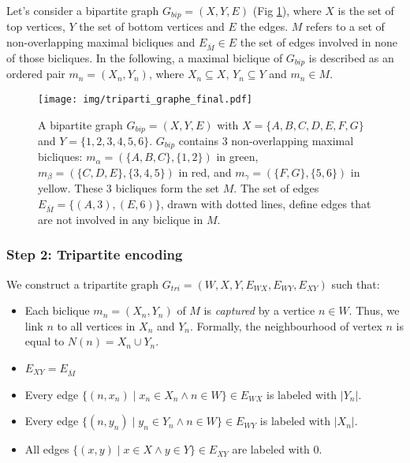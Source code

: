 \documentclass[table]{report}
\begin{document}
Let's consider a bipartite graph $G_{bip}=(X,Y,E)$ (Fig \ref{fig:triparti_graphe_exemple}), where $X$ is the set of top vertices, $Y$ the set of bottom vertices and $E$ the edges. $M$ refers to a set of non-overlapping maximal bicliques and $E_{\overline{M}} \in E$ the set of edges involved in none of those bicliques. In the following, a maximal biclique of $G_{bip}$ is described as an ordered pair $ m_n = (X_n,Y_n)$, where $X_n \subseteq X$, $Y_n \subseteq Y$ and $m_n \in M$. 
  

\begin{figure}[h]%
\centering
\texttt{[image: img/triparti\_graphe\_final.pdf]}
\caption{A bipartite graph $G_{bip} = (X,Y,E)$ with $X = \{A,B,C,D,E,F,G\}$ and $Y= \{1,2,3,4,5,6\}$. $G_{bip}$ contains 3 non-overlapping maximal bicliques: 
$m_\alpha = (\{A,B,C\}, \{1,2\})$ in green,  
$m_\beta = (\{C,D,E\}, \{3,4,5\})$ in red, 
and $m_\gamma = (\{F,G\}, \{5,6\})$ in yellow. These 3 bicliques form the set $M$. 
The set of edges $E_{\overline{M}} = \{(A,3),(E,6)\}$, drawn with dotted lines, define edges that are not involved in any biclique in $M$.}
\label{fig:triparti_graphe_exemple}
\end{figure}
\FloatBarrier


\subsubsection{Step 2: Tripartite encoding}

\noindent
We construct a tripartite graph $G_{tri}=(W,X,Y,E_{WX},E_{WY},E_{XY} )$ such that:
\begin{itemize}[noitemsep]
\item Each biclique $m_n = (X_n, Y_n)$ of $M$ is \textit{captured} by a vertice $n \in W$. Thus, we link $n$ to all vertices in $X_n$ and $Y_n$. Formally, the neighbourhood of vertex $n$ is equal to $N(n) = X_n \cup Y_n$. 
\item $E_{XY} = E_{\overline{M}}$
\item Every edge $\{(n, x_n) \mid x_n \in X_n \wedge n \in W\} \in E_{WX}$ is labeled with $|Y_n|$.
\item Every edge $\{(n, y_n) \mid y_n \in Y_n \wedge n \in W\} \in E_{WY}$ is labeled with $|X_n|$.
\item All edges $\{(x, y) \mid x \in X \wedge y \in Y \} \in E_{XY}$ are labeled with 0.
\end{itemize}

\end{document}
